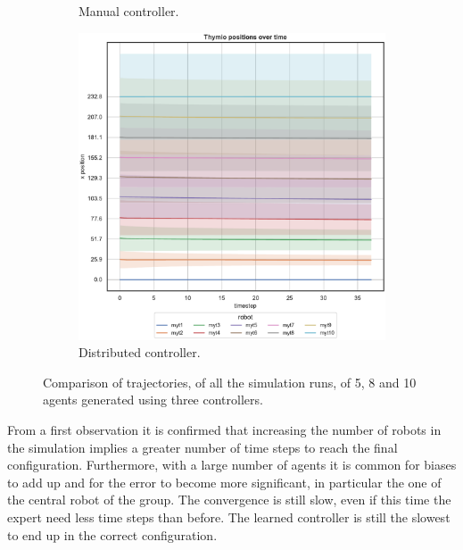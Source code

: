 \begin{figure}[!htb]
\begin{center}
\begin{subfigure}[h]{0.325\textwidth}
		\caption{Manual controller.}
	\end{subfigure}
	\hfill
	\begin{subfigure}[h]{0.325\textwidth}
		\centering
		\includegraphics[width=\textwidth]{contents/images/net-d18/N10/position-overtime-distributed}
		\caption{Distributed controller.}
	\end{subfigure}
\end{center}
\vspace{-0.5cm}
	\caption[Evaluation of the trajectories learned by \texttt{net-d18} using 5, 8 
	and 10 agents.]{Comparison of trajectories, of all the simulation runs, of 5, 8 
	and 10 agents generated using three controllers.}
	\label{fig:net-d18traj10}
\end{figure}
From a first observation it is confirmed that increasing the number of robots in 
the simulation implies a greater number of time steps to reach the final 
configuration.
Furthermore, with a large number of agents it is common for biases to add up 
and for the error to become more significant, in particular the one of the central 
robot of the group.
The convergence is still slow, even if this time the expert need less time steps than 
before. 
The learned controller is still the slowest to end up in the correct configuration.

